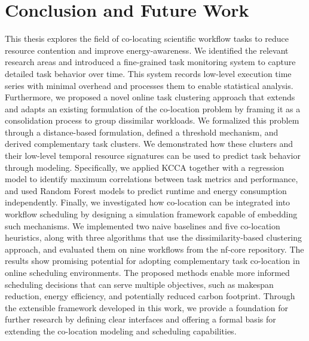 \section{Conclusion and Future Work}
\label{cha:conclusionfuturework}
This thesis explores the field of co-locating scientific workflow tasks to reduce resource contention and improve energy-awareness. We identified the relevant research areas and introduced a fine-grained task monitoring system to capture detailed task behavior over time. This system records low-level execution time series with minimal overhead and processes them to enable statistical analysis.
Furthermore, we proposed a novel online task clustering approach that extends and adapts an existing formulation of the co-location problem by framing it as a consolidation process to group dissimilar workloads. We formalized this problem through a distance-based formulation, defined a threshold mechanism, and derived complementary task clusters. We demonstrated how these clusters and their low-level temporal resource signatures can be used to predict task behavior through modeling. Specifically, we applied KCCA together with a regression model to identify maximum correlations between task metrics and performance, and used Random Forest models to predict runtime and energy consumption independently.
Finally, we investigated how co-location can be integrated into workflow scheduling by designing a simulation framework capable of embedding such mechanisms. We implemented two naive baselines and five co-location heuristics, along with three algorithms that use the dissimilarity-based clustering approach, and evaluated them on nine workflows from the nf-core repository.
The results show promising potential for adopting complementary task co-location in online scheduling environments. The proposed methods enable more informed scheduling decisions that can serve multiple objectives, such as makespan reduction, energy efficiency, and potentially reduced carbon footprint.
Through the extensible framework developed in this work, we provide a foundation for further research by defining clear interfaces and offering a formal basis for extending the co-location modeling and scheduling capabilities.

